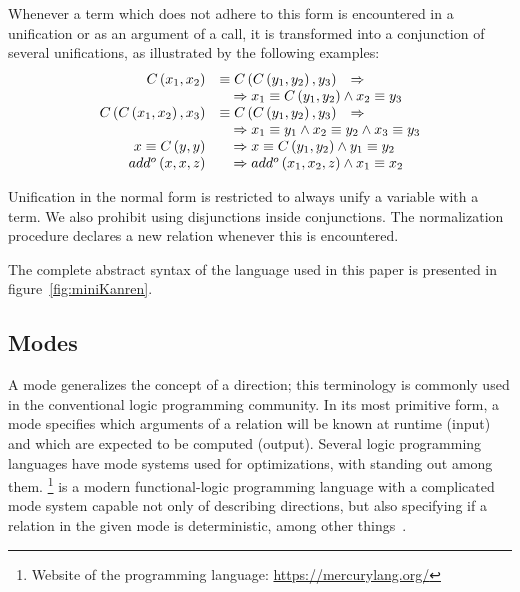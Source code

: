 Whenever a term which does not adhere to this form is encountered in a unification or as an argument of a call, it is transformed into a conjunction of several unifications, as illustrated by the following examples:
\[
    \begin{array}{rll}
        C\left( x_1, x_2 \right)                      & \equiv C\left( C\left( y_1, y_2 \right), y_3 \right)                                          & \Rightarrow \\
                                                      & \multicolumn{2}{l}{\quad\Rightarrow x_1 \equiv C\left( y_1, y_2 \right) \land x_2 \equiv y_3}               \\
        C\left( C\left( x_1, x_2 \right), x_3 \right) & \equiv C\left( C\left( y_1, y_2 \right), y_3 \right)                                          & \Rightarrow \\
                                                      & \multicolumn{2}{l}{\quad\Rightarrow x_1 \equiv y_1 \land x_2 \equiv y_2 \land x_3 \equiv y_3}               \\
        x \equiv C \left(y, y \right)                 & \multicolumn{2}{l}{\quad\Rightarrow x \equiv C \left(y_1, y_2\right) \land y_1 \equiv y_2}                  \\
        add^o\left( x, x, z \right)                   & \multicolumn{2}{l}{\quad\Rightarrow add^o\left( x_1, x_2, z \right) \land x_1 \equiv x_2}
    \end{array}
\]

Unification in the normal form is restricted to always unify a variable with a term.
We also prohibit using disjunctions inside conjunctions.
The normalization procedure declares a new relation whenever this is encountered.

The complete abstract syntax of the \micro language used in this paper is presented in figure~\ref{fig:miniKanren}.

\subsection{Modes}

A mode generalizes the concept of a direction; this terminology is commonly used in the conventional logic programming community.
In its most primitive form, a mode specifies which arguments of a relation will be known at runtime (input) and which are expected to be computed (output).
Several logic programming languages have mode systems used for optimizations, with \merc standing out among them.
\merc\footnote{Website of the \merc programming language: \url{https://mercurylang.org/}} is a modern functional-logic programming language with a complicated mode system capable not only of describing directions, but also specifying if a relation in the given mode is deterministic, among other things~\cite{overton2002constraint}.

